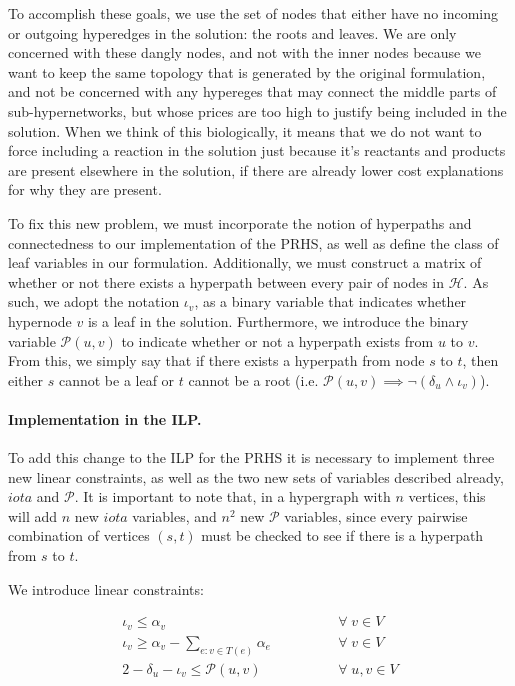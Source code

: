 \documentclass[12pt,twoside]{reedthesis}
\theoremstyle{definition}
\begin{document}
To accomplish these goals, we use the set of nodes that either have no incoming or outgoing hyperedges in the solution: the roots and leaves. We are only concerned with these dangly nodes, and not with the inner nodes because we want to keep the same topology that is generated by the original formulation, and not be concerned with any hypereges that may connect the middle parts of sub-hypernetworks, but whose prices are too high to justify being included in the solution. When we think of this biologically, it means that we do not want to force including a reaction in the solution just because it's reactants and products are present elsewhere in the solution, if there are already lower cost explanations for why they are present.\par

To fix this new problem, we must incorporate the notion of hyperpaths and connectedness to our implementation of the PRHS, as well as define the class of leaf variables in our formulation. Additionally, we must construct a matrix of whether or not there exists a hyperpath between every pair of nodes in $\mathcal{H}$. As such, we adopt the notation $\iota_v$, as a binary variable that indicates whether hypernode $v$ is a leaf in the solution. Furthermore, we introduce the binary variable $\mathcal{P}(u,v)$ to indicate whether or not a hyperpath exists from $u$ to $v$. From this, we simply say that if there exists a hyperpath from node $s$ to $t$, then either $s$ cannot be a leaf or $t$ cannot be a root (i.e. $\mathcal{P}(u,v)\implies\neg(\delta_u\wedge\iota_v)$).\par

\paragraph{Implementation in the ILP.}To add this change to the ILP for the PRHS it is necessary to implement three new linear constraints, as well as the two new sets of variables described already, $iota$ and $\mathcal{P}$. It is important to note that, in a hypergraph with $n$ vertices, this will add $n$ new $iota$ variables, and $n^2$ new $\mathcal{P}$ variables, since every pairwise combination of vertices $(s,t)$ must be checked to see if there is a hyperpath from $s$ to $t$.

We introduce linear constraints:

\begin{align}
 \iota_v \leq \alpha_v \qquad\qquad &\forall\; v \in V\label{eq:dc1}\\
 \iota_v \geq \alpha_{v} - \sum_{e:v \in T(e)} \alpha_e \qquad\qquad &\forall\; v \in V\label{eq:dc2}\\
 2 - \delta_u - \iota_v \leq \mathcal{P}(u,v) \qquad\qquad &\forall\; u,v \in V\label{eq:dc3}%
\end{align}%
\end{document}
